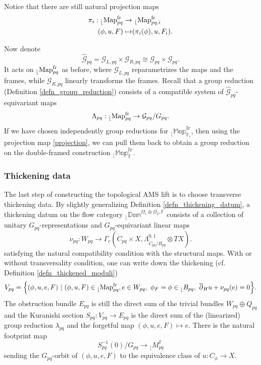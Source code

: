 \documentclass[reqno, 10pt]{amsart}
\numberwithin{equation}{section}
\numberwithin{equation}{section}
\theoremstyle{definition}
\theoremstyle{remark}
\newcommand{\beq}{\begin{equation}}
\newcommand{\eeq}{\end{equation}}
\newcommand{\beqn}{\begin{equation*}}
\newcommand{\eeqn}{\end{equation*}}
\newcommand{\ov}{\overline}
\newcommand{\mb}{\mathbb}
\newcommand{\mc}{\mathcal}
\renewcommand{\outer}{{}_{\lfloor}}
\begin{document}
Notice that there are still natural projection maps
\beq\label{projection}
\begin{split}
\pi_i: \outer {\rm Map}_{pq}^{\rm fr} \to &\ \outer {\rm Map}_{pq, i}^{\rm fr}\\
(\phi, u, F) \mapsto & (\pi_i(\phi), u, F_i).
\end{split}
\eeq

Now denote
\beqn
\hat {\mc G}_{pq} = {\mc G}_{L, pq} \times {\mc G}_{R, pq} \cong {\mc G}_{pq} \times {\mc G}_{pq}.
\eeqn
It acts on $\outer {\rm Map}_{pq}^{\rm fr}$ as before, where ${\mc G}_{L, pq}$ reparametrizes the maps and the frames, while ${\mc G}_{R, pq}$ linearly transforms the frames. Recall that a group reduction (Definition \ref{defn_group_reduction}) consists of a compatible system of $\hat {\mc G}_{pq}$-equivariant maps
\beqn
\Lambda_{pq}: \outer {\rm Map}_{pq}^{\rm fr} \to {\mc G}_{pq}/ G_{pq}.
\eeqn
If we have chosen independently group reductions for $\outer \mb{Map}_{{\mb F}_i}^{\mb{fr}}$, then using the projection map \eqref{projection}, we can pull them back to obtain a group reduction on the double-framed construction $\outer \mb{Map}_{\mb{F}}^{\mb{fr}}$.

\subsubsection{Thickening data}

The last step of constructing the topological AMS lift is to choose transverse thickening data. By slightly generalizing Definition \ref{defn_thickening_datum}, a thickening datum on the flow category $\outer \mb{Dom}^{\Omega_1\oplus \Omega_2, {\mb F}}$ consists of a collection of unitary $G_{pq}$-representations and $G_{pq}$-equivariant linear maps 
\beqn
\nu_{pq}: W_{pq} \to \Gamma_c( \mathring C_{pq} \times X, \Lambda_{\mathring C_{pq}/ B_{pq}}^{0,1}\otimes TX).
\eeqn
satisfying the natural compatibility condition with the structural maps. With or without transversality condition, one can write down the thickening (cf. Definition \ref{defn_thickened_moduli}) 
\beqn
V_{pq} = \Big\{ (\phi, u, e, F)\ |\ (\phi, u, F) \in \outer {\rm Map}_{pq}^{\rm fr}, e \in W_{pq},\ \phi_F = \phi \in \outer B_{pq},\ \ov\partial_H u + \nu_{pq}(e) = 0 \Big\}.
\eeqn
The obstruction bundle $E_{pq}$ is still the direct sum of the trivial bundles $W_{pq} \oplus Q_{pq}$ and the Kuranishi section $S_{pq}: V_{pq} \to E_{pq}$ is the direct sum of the (linearized) group reduction $\lambda_{pq}$ and the forgetful map $(\phi, u, e, F) \mapsto e$. There is the natural footprint map
\beqn
S_{pq}^{-1}(0)/ G_{pq} \to \outer M_{pq}^{\mb F}
\eeqn
sending the $G_{pq}$-orbit of $(\phi, u, e, F)$ to the equivalence class of $u: C_\phi \to X$. 
\end{document}
